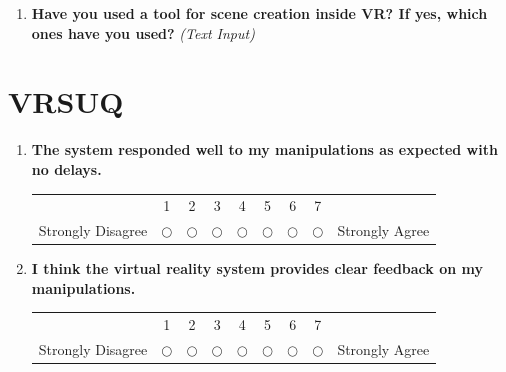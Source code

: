 \documentclass[inscr,ack,preface]{dithesis}
\begin{document}
\begin{appendix}
\begin{enumerate}
    \item \textbf{Have you used a tool for scene creation inside VR? If yes, which ones have you used?}
          \textit{(Text Input)}

  \end{enumerate}

  \section{VRSUQ}
  \begin{enumerate}
    \item \begin{minipage}[t]{\linewidth}
            \textbf{The system responded well to my manipulations as expected with no delays.}
            \begin{center}
              \small
              \renewcommand{\arraystretch}{1.5}
              \begin{tabular}{ccccccccc}
                                  & 1          & 2          & 3          & 4          & 5          & 6          & 7          &                \\
                Strongly Disagree & $\bigcirc$ & $\bigcirc$ & $\bigcirc$ & $\bigcirc$ & $\bigcirc$ & $\bigcirc$ & $\bigcirc$ & Strongly Agree
              \end{tabular}
            \end{center}
          \end{minipage}

    \item \begin{minipage}[t]{\linewidth}
            \textbf{I think the virtual reality system provides clear feedback on my manipulations.}
            \begin{center}
              \small
              \renewcommand{\arraystretch}{1.5}
              \begin{tabular}{ccccccccc}
                                  & 1          & 2          & 3          & 4          & 5          & 6          & 7          &                \\
                Strongly Disagree & $\bigcirc$ & $\bigcirc$ & $\bigcirc$ & $\bigcirc$ & $\bigcirc$ & $\bigcirc$ & $\bigcirc$ & Strongly Agree
              \end{tabular}
            \end{center}
          \end{minipage}



\end{enumerate}
\end{appendix}
\end{document}
